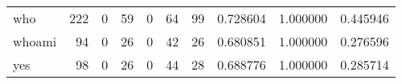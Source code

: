 \begin{longtable}{lrrrrrrrrr}
who       &                                                222 &                                                  0 &                                                 59 &                                                  0 &                                                 64 &                                                 99 &                                           0.728604 &                               1.000000 &                             0.445946 \\
whoami    &                                                 94 &                                                  0 &                                                 26 &                                                  0 &                                                 42 &                                                 26 &                                           0.680851 &                               1.000000 &                             0.276596 \\
yes       &                                                 98 &                                                  0 &                                                 26 &                                                  0 &                                                 44 &                                                 28 &                                           0.688776 &                               1.000000 &                             0.285714 \\
\end{longtable}
